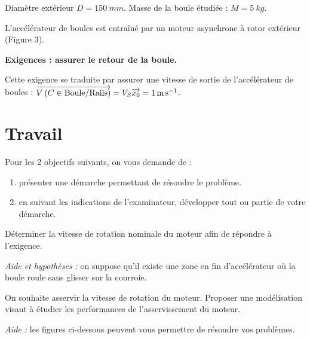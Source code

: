 \documentclass[10pt,fleqn]{article} %
\begin{document}
\begin{multicols}{2}
\begin{center}
Diamètre extérieur $D=\SI{150}{mm}$. Masse de la boule étudiée : $M=\SI{5}{kg}$.
\end{center}


L’accélérateur de boules est entraîné par un moteur asynchrone à rotor extérieur (Figure 3).

\begin{obj}
\textbf{Exigences : assurer le retour de la boule.}

Cette exigence se traduite par assurer une vitesse de sortie de l'accélérateur de boules : 
$\overrightarrow{V\left( {C} \in {\text{Boule}}/{\text{Rails}}\right)}=V_S\overrightarrow{x_0} = \SI{1}{m.s^{-1}}$.

\end{obj}

\section*{Travail}

Pour les 2 objectifs suivants, on vous demande de :
\begin{enumerate}
\item présenter une démarche permettant de résoudre le problème.
\item en suivant les indications de l’examinateur, développer tout ou partie de votre
démarche.
\end{enumerate}

\begin{obj}[Objectif 1]
Déterminer la vitesse de rotation nominale du moteur afin de répondre à l’exigence.

\textit{Aide et hypothèses : }on suppose qu’il existe une zone en fin d’accélérateur où la boule roule sans glisser sur la courroie.
\end{obj}

\begin{obj}[Objectif 2]
On souhaite asservir la vitesse de rotation du moteur. Proposer une modélisation visant à
étudier les performances de l’asservissement du moteur.

\textit{Aide :} les figures ci-dessous peuvent vous permettre de résoudre vos problèmes.
\end{obj}


\end{multicols}
\end{document}
